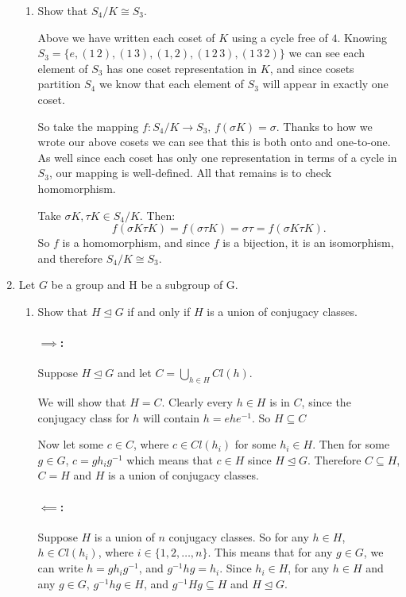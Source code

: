 \documentclass{article}
\begin{document}
\begin{enumerate}
\begin{enumerate}[label= (\alph*)]
    \item  Show that $S_4/K \cong S_3$.

        Above we have written each coset of $K$ using a cycle free of $4$. Knowing 
        $S_3=\{e,(1\,2),(1\,3),(1,2),(1\,2\,3),(1\,3\,2)\} $ we can see each element of $S_3$
        has one coset representation in $K$,
        and since cosets partition $S_4$ we know that each element of $S_3$ will appear in exactly 
        one coset.

        So take the mapping $f:S_4/K\to S_3,\, f(\sigma K)=\sigma$. Thanks to how we wrote our
        above cosets we can see that this is both onto and one-to-one. As well since each coset has
        only one representation in terms of a cycle in $S_3$, our mapping is well-defined.
        All that remains is to check homomorphism.

        Take $\sigma K,\tau K\in S_4 /K$. Then:
        \[
        f(\sigma K\tau K)=f(\sigma\tau K)=\sigma\tau=f(\sigma K \tau K)
        .\] 
        So $f$ is a homomorphism, and since $f$ is a bijection, it is an isomorphism, and therefore
        $S_4/K\cong S_3$.

\end{enumerate}
\item Let $G$ be a group and H be a subgroup of G.
    \begin{enumerate}[label= (\alph*)] 
        \item Show that $H \trianglelefteq  G$ if and only if $H$ is a union of conjugacy classes.

            \paragraph{$\implies$:} Suppose $H\trianglelefteq G$ and let $C=\bigcup_{h\in H} Cl(h)$.

            We will show that $H=C$. Clearly every $h\in H$ is in $C$, since the conjugacy class for
            $h$ will contain $h=ehe^{-1}$. So $H\subseteq C$

            Now let some $c\in C$, where $c\in Cl(h_i)$ for some $h_i\in H$. Then for some $g\in G$,
            $c=gh_ig^{-1}$ which means that $c\in H$ since $H\trianglelefteq G$. Therefore 
            $C\subseteq H$, $C=H$ and $H$ is a union of conjugacy classes.

            \paragraph{$\impliedby$:} Suppose $H$ is a union of $n$ conjugacy classes.
            So for any $h\in H$, $h\in Cl(h_i)$, where $i\in \{1,2,\ldots,n\} $.
            This means that for any $g\in G$, we can write $h=gh_ig^{-1}$, and $g^{-1}hg=h_i$. 
            Since $h_i\in H$, for any $h\in H$ and any $g\in G$, $g^{-1}hg\in H$,
            and $g^{-1}Hg\subseteq H$ and $H\trianglelefteq G$.


\end{enumerate}
\end{enumerate}
\end{document}
